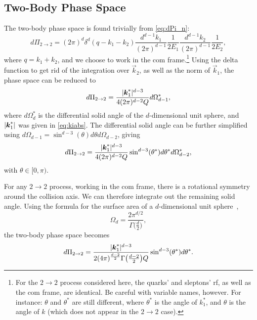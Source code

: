 \subsection{Two-Body Phase Space}\label{sec:two_body_phase_space}
The two-body phase space is found trivially from \cref{eq:dPi_n}:
\begin{equation}
    d\Pi_{2 \to 2} = (2\pi)^d \delta^d(q-k_1-k_2) \frac{d^{d-1}k_1}{(2\pi)^{d-1}}\frac{1}{2E_1}\frac{d^{d-1}k_2}{(2\pi)^{d-1}}\frac{1}{2E_2},
    \label{eq:dPi_2}
\end{equation}
where $q=k_1+k_2$, and we choose to work in the \gls{com} frame.\footnote{For the $2\to2$ process considered here, the quarks' and sleptons' \gls{rf}, as well as the \gls{com} frame, are identical. Be careful with variable names, however. For instance: $\theta$ and $\theta^*$ are still different, where $\theta^*$ is the angle of $k_1^*$, and $\theta$ is the angle of $k$ (which does not appear in the $2\to2$ case).}
Using the delta function to get rid of the integration over $\vec{k}_2$, as well as the norm of $\vec{k}_1$, the phase space can be reduced to
\begin{equation}
    d\Pi_{2 \to 2} = \frac{\lvert\boldsymbol{k}_1^*\rvert^{d-3}}{4(2\pi)^{d-2}Q} d\Omega^*_{d-1},
    \label{eq:dPi_2_dOmega}
\end{equation}
where $d\Omega_d^*$ is the differential solid angle of the $d$-dimensional unit sphere, and $\lvert\boldsymbol{k}_1^*\rvert$ was given in \cref{eq:kiabs}.
The differential solid angle can be further simplified using $d\Omega_{d-1} = \sin^{d-3}(\theta)d\theta d\Omega_{d-2}$, giving
\begin{equation}
    d\Pi_{2 \to 2} = \frac{\lvert\boldsymbol{k}_1^*\rvert^{d-3}}{4(2\pi)^{d-2}Q} \sin^{d-3}(\theta^*)d\theta^* d\Omega^*_{d-2},
\end{equation}
with $\theta \in [0, \pi)$.

For any $2\to 2$ process, working in the \gls{com} frame, there is a rotational symmetry around the collision axis. We can therefore integrate out the remaining solid angle. Using the formula for the surface area of a $d$-dimensional unit sphere~\cite{Schwartz:2014sze},
\begin{equation}
    \Omega_d = \frac{2\pi^{d/2}}{\Gamma\bigl(\frac{d}{2}\bigr)},
\end{equation}
the two-body phase space becomes
\begin{equation}
    d\Pi_{2 \to 2} = \frac{\lvert\boldsymbol{k}_1^*\rvert^{d-3}}{2(4\pi)^{\frac{d-2}{2}} \Gamma\bigl(\frac{d-2}{2}\bigr) Q} \sin^{d-3}(\theta^*)d\theta^*.
    \label{eq:dPi_2_k1}
\end{equation}

